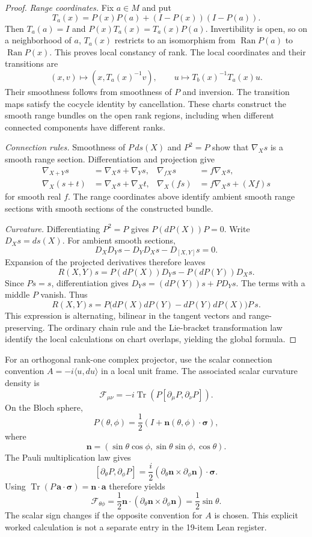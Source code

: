 \documentclass[11pt]{article}
\theoremstyle{definition}
\theoremstyle{remark}
\newcommand{\cF}{\mathcal F}
\newcommand{\Tr}{\operatorname{Tr}}
\newcommand{\Ran}{\operatorname{Ran}}
\begin{document}
\begin{proof}
\textit{Range coordinates.} Fix $a\in M$ and put
\[
T_a(x)=P(x)P(a)+(I-P(x))(I-P(a)).
\]
Then $T_a(a)=I$ and $P(x)T_a(x)=T_a(x)P(a)$. Invertibility is open, so on a neighborhood of $a$, $T_a(x)$ restricts to an isomorphism from $\Ran P(a)$ to $\Ran P(x)$. This proves local constancy of rank. The local coordinates and their transitions are
\[
(x,v)\longmapsto (x,T_a(x)^{-1}v),\qquad
u\longmapsto T_b(x)^{-1}T_a(x)u.
\]
Their smoothness follows from smoothness of $P$ and inversion. The transition maps satisfy the cocycle identity by cancellation. These charts construct the smooth range bundles on the open rank regions, including when different connected components have different ranks.

\textit{Connection rules.} Smoothness of $P\,ds(X)$ and $P^2=P$ show that $\nabla_Xs$ is a smooth range section. Differentiation and projection give
\[
\begin{aligned}
\nabla_{X+Y}s&=\nabla_Xs+\nabla_Ys,&
\nabla_{fX}s&=f\nabla_Xs,\\
\nabla_X(s+t)&=\nabla_Xs+\nabla_Xt,&
\nabla_X(fs)&=f\nabla_Xs+(Xf)s
\end{aligned}
\]
for smooth real $f$. The range coordinates above identify ambient smooth range sections with smooth sections of the constructed bundle.

\textit{Curvature.} Differentiating $P^2=P$ gives $P(dP(X))P=0$. Write $D_Xs=ds(X)$. For ambient smooth sections,
\[
D_XD_Ys-D_YD_Xs-D_{[X,Y]}s=0.
\]
Expansion of the projected derivatives therefore leaves
\[
R(X,Y)s=P(dP(X))D_Ys-P(dP(Y))D_Xs.
\]
Since $Ps=s$, differentiation gives $D_Ys=(dP(Y))s+PD_Ys$. The terms with a middle $P$ vanish. Thus
\[
R(X,Y)s=P\bigl(dP(X)dP(Y)-dP(Y)dP(X)\bigr)P\,s.
\]
This expression is alternating, bilinear in the tangent vectors and range-preserving. The ordinary chain rule and the Lie-bracket transformation law identify the local calculations on chart overlaps, yielding the global formula.
\end{proof}

For an orthogonal rank-one complex projector, use the scalar connection convention $A=-i\langle u,du\rangle$ in a local unit frame. The associated scalar curvature density is
\[
\cF_{\mu\nu}
=-i\Tr\left(P[\partial_\mu P,\partial_\nu P]\right).
\]
On the Bloch sphere,
\[
P(\theta,\phi)
=
\frac12\left(I+\mathbf n(\theta,\phi)\cdot\boldsymbol\sigma\right),
\]
where
\[
\mathbf n=(\sin\theta\cos\phi,\sin\theta\sin\phi,\cos\theta).
\]
The Pauli multiplication law gives
\[
[\partial_\theta P,\partial_\phi P]
=\frac{i}{2}(\partial_\theta\mathbf n\mathbin{\times}\partial_\phi\mathbf n)\cdot\boldsymbol\sigma.
\]
Using $\Tr(P\,\mathbf a\cdot\boldsymbol\sigma)=\mathbf n\cdot\mathbf a$ therefore yields
\[
\boxed{\cF_{\theta\phi}
=\frac12\mathbf n\cdot(\partial_\theta\mathbf n\mathbin{\times}\partial_\phi\mathbf n)
=\frac12\sin\theta.}
\]
The scalar sign changes if the opposite convention for $A$ is chosen. This explicit worked calculation is not a separate entry in the 19-item Lean register.
\end{document}
